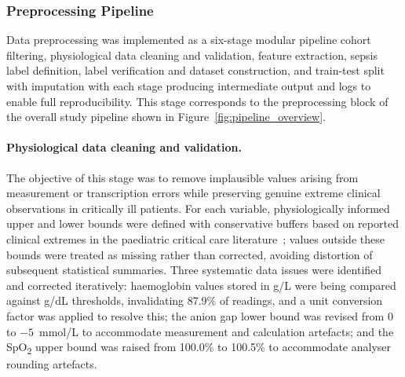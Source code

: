 \documentclass[final,3p,times]{elsarticle}
\begin{document}
\subsubsection{Preprocessing Pipeline}
\label{subsec:preprocessing_pipeline}

Data preprocessing was implemented as a six-stage modular
pipeline  cohort filtering, physiological data cleaning and
validation, feature extraction, sepsis label definition, label
verification and dataset construction, and train-test split with
imputation  with each stage producing intermediate output and
logs to enable full reproducibility. This stage corresponds to the
preprocessing block of the overall study pipeline shown in
Figure~\ref{fig:pipeline_overview}.

\paragraph{Physiological data cleaning and validation.} The
objective of this stage was to remove implausible values arising
from measurement or transcription errors while preserving genuine
extreme clinical observations in critically ill patients. For each
variable, physiologically informed upper and lower bounds were
defined with conservative buffers based on reported clinical
extremes in the paediatric critical care
literature~\cite{sanchezpinto2024, zeng2020}; values outside these
bounds were treated as missing rather than corrected, avoiding
distortion of subsequent statistical summaries. Three systematic
data issues were identified and corrected iteratively: haemoglobin
values stored in g/L were being compared against g/dL thresholds,
invalidating 87.9\% of readings, and a unit conversion factor was
applied to resolve this; the anion gap lower bound was revised
from 0 to $-5$~mmol/L to accommodate measurement and calculation
artefacts; and the SpO\textsubscript{2} upper bound was raised
from 100.0\% to 100.5\% to accommodate analyser rounding
artefacts.
\end{document}
